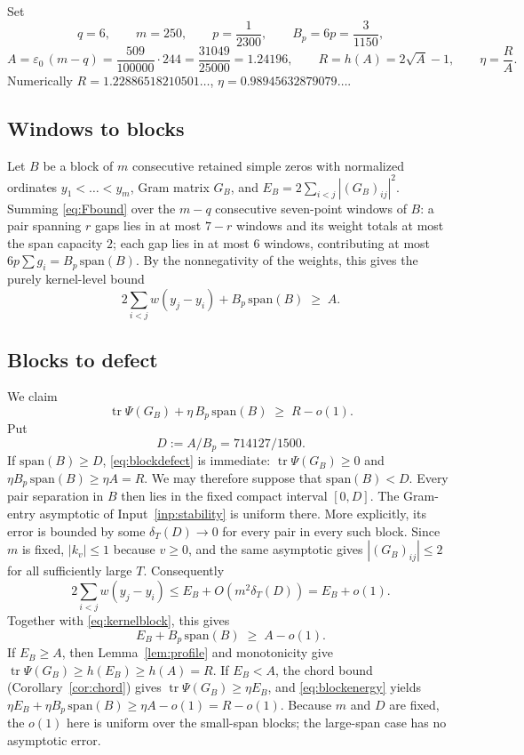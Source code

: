 \documentclass[11pt]{article}
\DeclareMathOperator{\tr}{tr}
\begin{document}
Set
\[
 q=6,\qquad m=250,\qquad p=\frac1{2300},\qquad B_p=6p=\frac{3}{1150},
\]
\[
 A=\varepsilon_0\,(m-q)=\frac{509}{100000}\cdot244=\frac{31049}{25000}
 =1.24196,\qquad
 R=h(A)=2\sqrt A-1,\qquad \eta=\frac RA .
\]
Numerically $R=1.22886518210501\ldots$, $\eta=0.98945632879079\ldots$.

\subsection{Windows to blocks}

Let $B$ be a block of $m$ consecutive retained simple zeros with normalized
ordinates $y_1<\dots<y_m$, Gram matrix $G_B$, and
$E_B=2\sum_{i<j}|(G_B)_{ij}|^2$.  Summing \eqref{eq:Fbound} over the $m-q$
consecutive seven-point windows of $B$: a pair spanning $r$ gaps lies in at
most $7-r$ windows and its weight totals at most the span capacity $2$; each
gap lies in at most $6$ windows, contributing at most
$6p\sum g_i=B_p\,\mathrm{span}(B)$.  By the nonnegativity of the weights,
this gives the purely kernel-level bound
\begin{equation}\label{eq:kernelblock}
 2\sum_{i<j}w(y_j-y_i)+B_p\,\mathrm{span}(B)\;\ge\;A.
\end{equation}

\subsection{Blocks to defect}

We claim
\begin{equation}\label{eq:blockdefect}
 \tr\Psi(G_B)+\eta\,B_p\,\mathrm{span}(B)\;\ge\;R-o(1).
\end{equation}
Put
\[
 D:=A/B_p=714127/1500.
\]
If $\mathrm{span}(B)\ge D$, \eqref{eq:blockdefect} is immediate:
$\tr\Psi(G_B)\ge0$ and
$\eta B_p\,\mathrm{span}(B)\ge\eta A=R$.  We may therefore suppose that
$\mathrm{span}(B)<D$.  Every pair separation in $B$ then lies in the fixed
compact interval $[0,D]$.  The Gram-entry asymptotic of
Input~\ref{inp:stability} is uniform there.  More explicitly, its error is
bounded by some $\delta_T(D)\to0$ for every pair in every such block.  Since
$m$ is fixed, $|k_v|\le1$ because $v\ge0$, and the same asymptotic gives
$|(G_B)_{ij}|\le2$ for all sufficiently large $T$.  Consequently
\[
 2\sum_{i<j}w(y_j-y_i)
 \le E_B+O(m^2\delta_T(D))=E_B+o(1).
\]
Together with \eqref{eq:kernelblock}, this gives
\begin{equation}\label{eq:blockenergy}
 E_B+B_p\,\mathrm{span}(B)\;\ge\;A-o(1).
\end{equation}
If $E_B\ge A$, then Lemma~\ref{lem:profile} and monotonicity give
$\tr\Psi(G_B)\ge h(E_B)\ge h(A)=R$.  If $E_B<A$, the chord bound
(Corollary~\ref{cor:chord}) gives
$\tr\Psi(G_B)\ge\eta E_B$, and \eqref{eq:blockenergy} yields
$\eta E_B+\eta B_p\,\mathrm{span}(B)\ge\eta A-o(1)=R-o(1)$.
Because $m$ and $D$ are fixed, the $o(1)$ here is uniform over the
small-span blocks; the large-span case has no asymptotic error.
\end{document}
